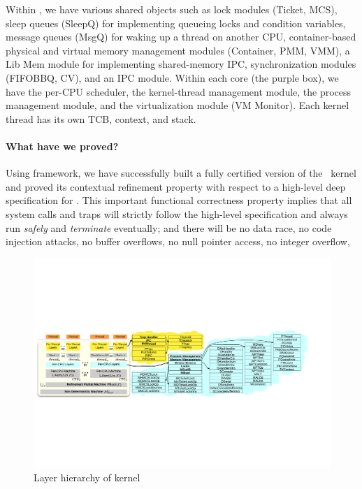 Within \cCTOS, we have various shared objects such as lock modules
(Ticket, MCS), sleep queues (SleepQ) for implementing queueing locks
and condition variables, message queues (MsgQ) for waking up a
thread on another CPU, container-based physical and virtual memory
management modules (Container, PMM, VMM), a Lib Mem module for
implementing shared-memory IPC, synchronization modules (FIFOBBQ,
CV), and an IPC module. Within each core (the purple box), we have
the per-CPU scheduler, the kernel-thread management module, the process
management module, and the virtualization module (VM Monitor). Each
kernel thread has its own TCB, context, and stack.

\paragraph{What have we proved?}
Using \CTOS{} framework, we have successfully built a fully certified version of
the \cCTOS\ kernel and proved its contextual refinement property with
respect to a high-level deep specification for \cCTOS.  This important
functional correctness property implies that all system calls and
traps will strictly follow the high-level specification and always run
{\em safely} and {\em terminate} eventually; and there will be no data
race, no code injection attacks, no buffer overflows, no null pointer
access, no integer overflow, \etc{}

\begin{figure}[t]
\includegraphics[width=1.0\textwidth]{figs/layer_diagram.pdf}
\caption{Layer hierarchy of \cCTOS{} kernel}
\label{fig:layer_diagram}
\hrulefill
\end{figure}

